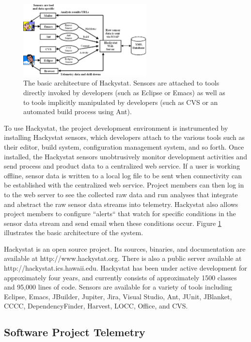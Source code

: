 \begin{figure}[htpb]
  \centering
  \includegraphics[width=0.60\textwidth]{architecture.eps}
  \caption{The basic architecture of Hackystat. Sensors are attached to
  tools directly invoked by developers (such as Eclipse or Emacs) as
  well as to tools implicitly manipulated by developers (such as CVS or 
  an automated build process using Ant).}
  \label{fig:architecture}
\end{figure}

To use Hackystat, the project development environment is 
instrumented by installing Hackystat sensors, which developers attach
to the various tools such as their editor, build system, configuration
management system, and so forth. Once installed, the Hackystat sensors
unobtrusively monitor development activities and send process and
product data to a centralized web service.  If a user is working
offline, sensor data is written to a local log file to be sent
when connectivity can be established with the centralized web service.
Project members can then log in to the web server to see the collected
raw data and run analyses that integrate and abstract the raw sensor
data streams into telemetry.  Hackystat also allows project members to
configure ``alerts`` that watch for specific conditions in the
sensor data stream and send email when these conditions occur. Figure
\ref{fig:architecture} illustrates the basic architecture of the system. 

Hackystat is an open source project. Its  sources, binaries, and
documentation are available at http://www.hackystat.org.  There is also a
public server available at http://hackystat.ics.hawaii.edu.  Hackystat has
been under active development for approximately four years, and currently
consists of approximately 1500 classes and 95,000 lines of code.  Sensors are
available for a variety of tools including Eclipse, Emacs, JBuilder,
Jupiter, Jira, Visual Studio, Ant, JUnit, JBlanket, CCCC, DependencyFinder,
Harvest, LOCC, Office, and CVS.  

\subsection {Software Project Telemetry}
\label{sec:telemetry}

